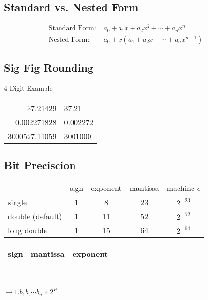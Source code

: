 \documentclass[10pt]{article}
\begin{document}
\begin{multicols}{2}
    \small
    \begin{minipage}{\columnwidth}
        \subsection*{Standard vs. Nested Form}
        \begin{align*}
            \text{Standard Form: } & a_0 + a_1 x + a_2 x^2 + \cdots + a_n x^n  \\
            \text{Nested Form: }   & a_0 + x(a_1 + a_2x + \cdots + a_nx^{n-1})
        \end{align*}
        \subsection*{Sig Fig Rounding}
        \tiny
        4-Digit Example \\
        \small
        \begin{tabular}{rl}
            37.21429      & 37.21    \\
            0.002271828   & 0.002272 \\
            3000527.11059 & 3001000  \\
        \end{tabular}
        \subsection*{Bit Preciscion}
        \begin{tabular}{lcccc}
                             & sign & exponent & mantissa & machine \(\epsilon\) \\
            single           & 1    & 8        & 23       & \(2^{-23}\)          \\
            double (default) & 1    & 11       & 52       & \(2^{-52}\)          \\
            long double      & 1    & 15       & 64       & \(2^{-64}\)
        \end{tabular}
        \begin{multicols}{2}
            \begin{tabular}{|c|c|c|}
                \hline
                sign & mantissa & exponent \\
                \hline
            \end{tabular}
            \\ \\
            \(\rightarrow 1.b_1b_2 \cdots b_n \times 2^P\)
        \end{multicols}

\end{minipage}
\end{multicols}
\end{document}
